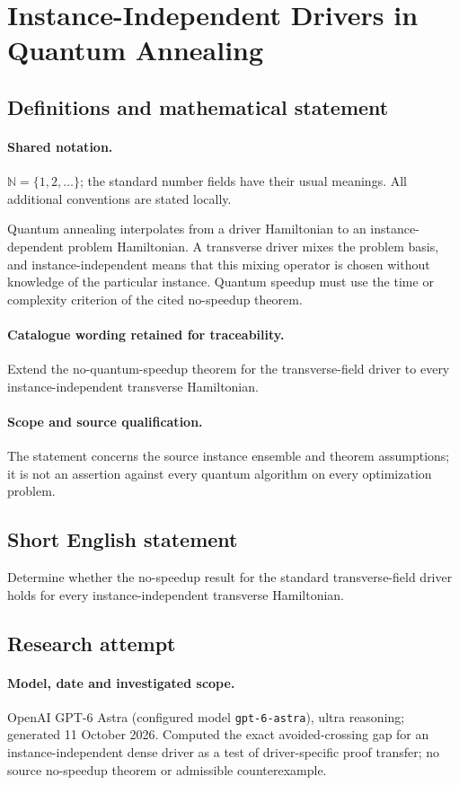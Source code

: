 \documentclass[11pt]{article}
\begin{document}
\section{Instance-Independent Drivers in Quantum Annealing}\label{statement}

\subsection{Definitions and mathematical statement}

\paragraph{Shared notation.}$\mathbb N=\{1,2,\ldots\}$; the standard number fields have their usual meanings. All additional conventions are stated locally.


Quantum annealing interpolates from a driver Hamiltonian to an instance-dependent problem Hamiltonian. A transverse driver mixes the problem basis, and instance-independent means that this mixing operator is chosen without knowledge of the particular instance. Quantum speedup must use the time or complexity criterion of the cited no-speedup theorem.

\paragraph{Catalogue wording retained for traceability.}
Extend the no-quantum-speedup theorem for the transverse-field driver to every instance-independent transverse Hamiltonian.

\paragraph{Scope and source qualification.}The statement concerns the source instance ensemble and theorem assumptions; it is not an assertion against every quantum algorithm on every optimization problem.
\subsection{Short English statement}
Determine whether the no-speedup result for the standard transverse-field driver holds for every instance-independent transverse Hamiltonian.
\subsection{Research attempt}
\paragraph{Model, date and investigated scope.}
OpenAI GPT-6 Astra (configured model \texttt{gpt-6-astra}), ultra reasoning; generated 11 October 2026. Computed the exact avoided-crossing gap for an instance-independent dense driver as a test of driver-specific proof transfer; no source no-speedup theorem or admissible counterexample.
\end{document}
